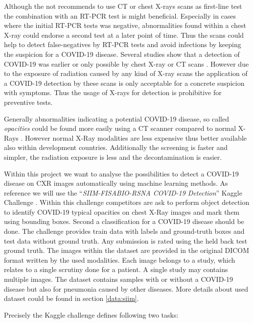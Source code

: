 Although the \citeauthor{acr2020recommendation} not recommends to use \ac{CT} or chest X-rays scans as first-line test \autocite{acr2020recommendation} the combination with an \ac{RT-PCR} test is might beneficial. Especially in cases where the initial \ac{RT-PCR} tests was negative, abnormalities found within a chest X-ray could endorse a second test at a later point of time. Thus the scans could help to detect false-negatives by \ac{RT-PCR} tests and avoid infections by keeping the suspicion for a COVID-19 disease. Several studies show that a detection of COVID-19 was earlier or only possible by chest X-ray or \ac{CT} scans \autocite{wang2020combination, tahamtan2020real}. However due to the exposure of radiation caused by any kind of X-ray scans the application of a COVID-19 detection by these scans is only acceptable for a concrete suspicion with symptoms. Thus the usage of X-rays for detection is prohibitive for preventive tests.

Generally abnormalities indicating a potential COVID-19 disease, so called \textit{opacities} could be found more easily using a CT scanner compared to normal X-Rays \autocite{jacobi2020portable}. However normal X-Ray modalities are less expensive thus better available also within development countries. Additionally the screening is faster and simpler, the radiation exposure is less and the decontamination is easier.

Within this project we want to analyse the possibilities to detect a COVID-19 disease on \ac{CXR} images automatically using machine learning methods. As reference we will use the \enquote{\textit{SIIM-FISABIO-RSNA COVID-19 Detection}} Kaggle Challenge \autocite{SIIMKaggle}. Within this challenge competitors are ask to perform object detection to identify COVID-19 typical opacities on chest X-Ray images and mark them using bounding boxes. Second a classification for a COVID-19 disease should be done.
The challenge provides train data with labels and ground-truth boxes and test data without ground truth. Any submission is rated using the held back test ground truth. The images within the dataset are provided in the original DICOM format written by the used modalities. Each image belongs to a study, which relates to a single scrutiny done for a patient. A single study may contains multiple images. The dataset contains samples with or without a COVID-19 disease but also for pneumonia caused by other diseases. More details about used dataset could be found in section \ref{data:siim}.

Precisely the Kaggle challenge defines following two tasks:

